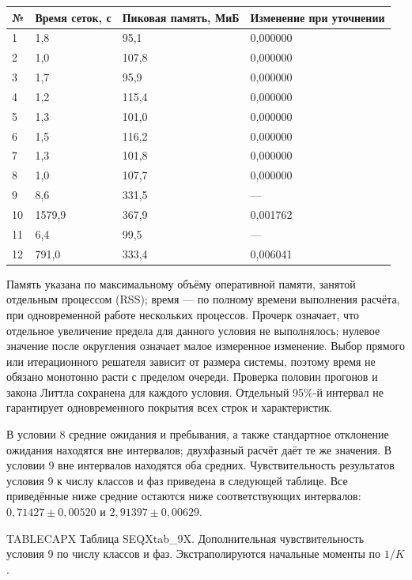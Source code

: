 \setlength{\tabcolsep}{2pt}
\begin{tabular}{p{0.94cm}p{4.25cm}p{4.72cm}p{5.67cm}}
\toprule
№ & Время сеток, с & Пиковая память, МиБ & Изменение при уточнении \\
\midrule
1 & 1,8 & 95,1 & 0,000000 \\
2 & 1,0 & 107,8 & 0,000000 \\
3 & 1,7 & 95,9 & 0,000000 \\
4 & 1,2 & 115,4 & 0,000000 \\
5 & 1,3 & 101,0 & 0,000000 \\
6 & 1,5 & 116,2 & 0,000000 \\
7 & 1,3 & 101,8 & 0,000000 \\
8 & 1,0 & 107,7 & 0,000000 \\
9 & 8,6 & 331,5 & — \\
10 & 1579,9 & 367,9 & 0,001762 \\
11 & 6,4 & 99,5 & — \\
12 & 791,0 & 333,4 & 0,006041 \\
\bottomrule
\end{tabular}




Память указана по максимальному объёму оперативной памяти, занятой отдельным процессом (RSS); время --- по полному времени выполнения расчёта, при одновременной работе нескольких процессов. Прочерк означает, что отдельное увеличение предела для данного условия не выполнялось; нулевое значение после округления означает малое измеренное изменение. Выбор прямого или итерационного решателя зависит от размера системы, поэтому время не обязано монотонно расти с пределом очереди. Проверка половин прогонов и закона Литтла сохранена для каждого условия. Отдельный 95\%-й интервал не гарантирует одновременного покрытия всех строк и характеристик.

В условии 8 средние ожидания и пребывания, а также стандартное отклонение ожидания находятся вне интервалов; двухфазный расчёт даёт те же значения. В условии 9 вне интервалов находятся оба средних. Чувствительность результатов условия 9 к числу классов и фаз приведена в следующей таблице. Все приведённые ниже средние остаются ниже соответствующих интервалов: \(0{,}71427\pm0{,}00520\) и \(2{,}91397\pm0{,}00629\).

\noindent TABLECAPX Таблица SEQXtab_9X. Дополнительная чувствительность условия 9 по числу классов и фаз. Экстраполируются начальные моменты по \(1/K\).\par

